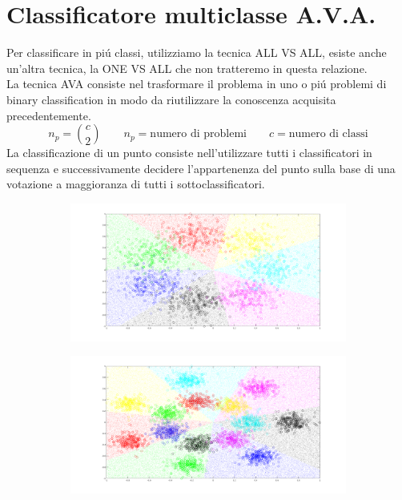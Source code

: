 \documentclass[12pt]{article}
\begin{document}
\newpage
\section{Classificatore multiclasse A.V.A.}
Per classificare in piú classi, utilizziamo la tecnica ALL VS ALL, esiste anche un'altra tecnica, la ONE VS ALL che non tratteremo in questa relazione. \\
La tecnica AVA consiste nel trasformare il problema in uno o piú problemi di binary classification in modo da riutilizzare la conoscenza acquisita precedentemente.
$$
  n_p = {c \choose 2} \qquad n_p = \text{numero di problemi} \qquad c = \text{numero di classi}
$$
La classificazione di un punto consiste nell'utilizzare tutti i classificatori in sequenza e successivamente
decidere l'appartenenza del punto sulla base di una votazione a maggioranza di tutti i sottoclassificatori.
\begin{figure}[H]
  \centering
  \begin{subfigure}{0.48\textwidth}
    \includegraphics[width=\textwidth]{images/Multiclass_linear}
  \end{subfigure}
  \begin{subfigure}{0.48\textwidth}
    \includegraphics[width=\textwidth]{images/Multiclass_linear_fails}
  \end{subfigure}
\end{figure}
\end{document}

